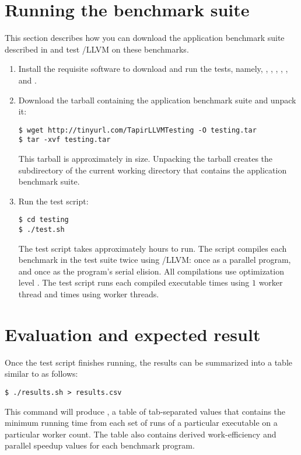 \section{Running the benchmark suite}\label{sec:experiment}

This section describes how you can download the application benchmark
suite described in  and test \tapir/LLVM on these
benchmarks.
\begin{enumerate}
\item Install the requisite software to download and run the tests,
  namely, , , , ,
  , and .

\item Download the tarball containing the application benchmark suite
  and unpack it:
\begin{verbatim}
$ wget http://tinyurl.com/TapirLLVMTesting -O testing.tar
$ tar -xvf testing.tar
\end{verbatim}
  This tarball is approximately 
  in size.  Unpacking the tarball creates the 
  subdirectory of the current working directory that contains the
  application benchmark suite.

\item Run the test script:
\begin{verbatim}
$ cd testing
$ ./test.sh
\end{verbatim}
  The test script takes approximately  hours to run.
  The script compiles each benchmark in the test suite twice using
  \tapir/LLVM: once as a parallel program, and once as the program's
  serial elision.  All compilations use optimization level .
  The test script runs each compiled executable 
  times using $1$ worker thread and  times using
   worker threads.
\end{enumerate}


\section{Evaluation and expected result}\label{sec:evaluate}


Once the test script finishes running, the results can be summarized
into a table similar to  as follows:
\begin{verbatim}
$ ./results.sh > results.csv
\end{verbatim}
This command will produce , a table of tab-separated
values that contains the minimum running time from each set of
 runs of a particular executable on a particular
worker count.  The table also contains derived work-efficiency and
parallel speedup values for each benchmark program.

